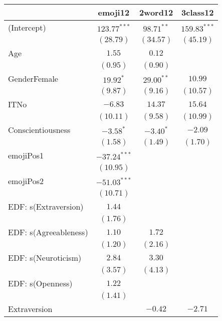 \begin{table}
\begin{center}
\begin{tabular}{l c c c }
	\hline
	& emoji12 & 2word12 & 3class12 \\
	\hline
	(Intercept)           & $123.77^{***}$ & $98.71^{**}$  & $159.83^{***}$ \\
	& $(28.79)$      & $(34.57)$     & $(45.19)$      \\
	Age                   & $1.55$         & $0.12$        &                \\
	& $(0.95)$       & $(0.90)$      &                \\
	GenderFemale          & $19.92^{*}$    & $29.00^{**}$  & $10.99$        \\
	& $(9.87)$       & $(9.16)$      & $(10.57)$      \\
	ITNo                  & $-6.83$        & $14.37$       & $15.64$        \\
	& $(10.11)$      & $(9.58)$      & $(10.99)$      \\
	Conscientiousness     & $-3.58^{*}$    & $-3.40^{*}$   & $-2.09$        \\
	& $(1.58)$       & $(1.49)$      & $(1.70)$       \\
	emojiPos1             & $-37.24^{***}$ &               &                \\
	& $(10.95)$      &               &                \\
	emojiPos2             & $-51.03^{***}$ &               &                \\
	& $(10.71)$      &               &                \\
	EDF: s(Extraversion)  & $1.44$         &               &                \\
	& $(1.76)$       &               &                \\
	EDF: s(Agreeableness) & $1.10$         & $1.72$        &                \\
	& $(1.20)$       & $(2.16)$      &                \\
	EDF: s(Neuroticism)   & $2.84$         & $3.30$        &                \\
	& $(3.57)$       & $(4.13)$      &                \\
	EDF: s(Openness)      & $1.22$         &               &                \\
	& $(1.41)$       &               &                \\
	Extraversion          &                & $-0.42$       & $-2.71$        \\

\end{tabular}
\end{center}
\end{table}
